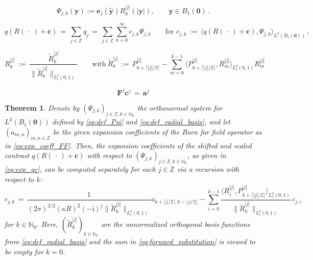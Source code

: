 \documentclass[10pt,a4paper]{amsart}
\newtheorem{theorem}{Theorem}
\newcommand{\Ltwo}{{L^2}}
\newcommand{\N}{\field{N}}
\newcommand{\Z}{\field{Z}}
\newcommand{\bfF}{{\bs F}}
\newcommand{\bfa}{{\bs a}}
\newcommand{\bfc}{{\bs c}}
\newcommand{\bfe}{{\bs e}}
\newcommand{\bfy}{{\bs y}}
\newcommand{\bfzero}{{\bs 0}}
\newcommand{\bs}{\boldsymbol}
\newcommand{\field}[1]{{\mathbb{#1}}}
\newcommand{\ph}{\,\cdot\,}
\newcommand{\rmi}{\mathrm{i}}
\newcommand{\yhat}{\widehat{\bfy}}
\begin{document}
\begin{equation}
\label{eq:def_Psi}
    \Psi_{j,k}(\bfy):=\bfe_j(\yhat)R_k^{|j|}(|\bfy|),
    \qquad  \bfy\in B_1(\bfzero)\,.
\end{equation}

\begin{equation}
\label{eq:exp_qc}
	q(R(\ph)+\bfc) \,=\, \sum_{j\in\Z} q_j \,=\, \sum_{j\in\Z}\sum_{k=0}^\infty c_{j,k} \Psi_{j,k}
	\qquad \text{for } c_{j,k}\,:=\, \big \langle q(R(\ph)+\bfc), \Psi_{j,k} \big \rangle_{\Ltwo(B_1(\bfzero))}\,,
\end{equation}

\begin{equation}
\label{eq:def_radial_basis}
  R_k^{|j|} \,:=\, \frac{\widetilde R_k^{|j|}}{\big \|\widetilde R_k^{|j|} \big \|_{L^2_r(0,1)}} 
    \qquad \text{with} \  \widetilde R_k^{|j|}
    \,:=\, P_{k+\lceil|j|/2\rceil}^{|j|} - \sum_{m=0}^{k-1} \big \langle P_{k+\lceil|j|/2\rceil}^{|j|},R_{m}^{|j|} \big \rangle_{L^2_r(0,1)}R_{m}^{|j|}
\end{equation}

\begin{equation}
\label{eq:infinite_system}
	\bfF^{j} \bfc^j\,=\, \bfa^j
\end{equation}

\begin{theorem}
\label{Theorem:main}
Denote by $(\Psi_{j,k})_{j\in\Z,k\in\N_0}$ the orthonormal system for $\Ltwo(B_1(\bfzero))$ defined by \eqref{eq:def_Psi} and \eqref{eq:def_radial_basis}, and let $(a_{m,n})_{m,n\in\Z}$ be the given expansion coefficients of the Born far field operator as in \eqref{eq:exp_coeff_FF}.
Then, the expansion coefficients of the shifted and scaled contrast $q(R(\ph)+\bfc)$ with respect to $(\Psi_{j,k})_{j\in\Z,k\in\N_0}$, as given in \eqref{eq:exp_qc}, can be computed separately for each $j \in \Z$ via a recursion with respect to $k$:
\begin{equation}
\label{eq:forward_substitution}
	c_{j,k} \,=\, \frac 1 {(2\pi)^{3/2}(\kappa R)^2(-\rmi)^j \big\| \widetilde{R}_{k}^{|j|} \big \|_{L^2_r(0,1)}} a_{k+\lceil j/2\rceil, k-\lfloor j/2\rfloor} 
	- \sum_{i=0}^{k-1} \frac{\big \langle R_{i}^{|j|}, P_{k+\lceil |j|/2\rceil}^{|j|} \big \rangle_{L^2_r(0,1)}}{\big\| \widetilde{R}_{k}^{|j|} \big\|_{L^2_r(0,1)} } \, c_{j, i}
\end{equation}
for $k \in \N_0$. Here, $(\widetilde{R}_{k}^{|j|})_{k \in \N_0}$ are the unnormalized orthogonal basis functions from \eqref{eq:def_radial_basis} and the sum in \eqref{eq:forward_substitution} is viewed to be empty for $k=0$.
\end{theorem}
\end{document}
